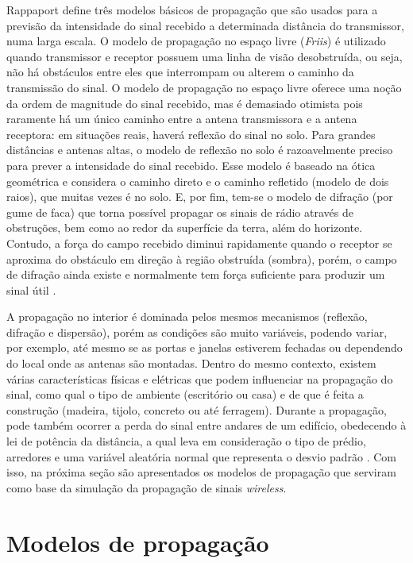 \documentclass[
	12pt,				%
	twoside,			%
	a4paper,			%
	english,			%
	french,				%
	spanish,			%
	brazil				%
	]{abntex2}
\begin{document}
Rappaport define três modelos básicos de propagação que são usados para
a previsão da intensidade do sinal recebido a determinada distância do
transmissor, numa larga escala. O modelo de propagação no espaço livre
(\emph{Friis}) é utilizado quando transmissor e receptor possuem uma
linha de visão desobstruída, ou seja, não há obstáculos entre eles que
interrompam ou alterem o caminho da transmissão do sinal. O modelo de
propagação no espaço livre oferece uma noção da ordem de magnitude do
sinal recebido, mas é demasiado otimista pois raramente há um único
caminho entre a antena transmissora e a antena receptora: em situações
reais, haverá reflexão do sinal no solo. Para grandes distâncias e
antenas altas, o modelo de reflexão no solo é razoavelmente preciso para
prever a intensidade do sinal recebido. Esse modelo é baseado na ótica
geométrica e considera o caminho direto e o caminho refletido (modelo de
dois raios), que muitas vezes é no solo. E, por fim, tem-se o modelo de
difração (por gume de faca) que torna possível propagar os sinais de
rádio através de obstruções, bem como ao redor da superfície da terra,
além do horizonte. Contudo, a força do campo recebido diminui
rapidamente quando o receptor se aproxima do obstáculo em direção à
região obstruída (sombra), porém, o campo de difração ainda existe e
normalmente tem força suficiente para produzir um sinal útil
\cite[p. 72-83]{RAPPAPORT}.

A propagação no interior é dominada pelos mesmos mecanismos (reflexão,
difração e dispersão), porém as condições são muito variáveis, podendo
variar, por exemplo, até mesmo se as portas e janelas estiverem fechadas
ou dependendo do local onde as antenas são montadas. Dentro do mesmo
contexto, existem várias características físicas e elétricas que podem
influenciar na propagação do sinal, como qual o tipo de ambiente
(escritório ou casa) e de que é feita a construção (madeira, tijolo,
concreto ou até ferragem). Durante a propagação, pode também ocorrer a
perda do sinal entre andares de um edifício, obedecendo à lei de
potência da distância, a qual leva em consideração o tipo de prédio,
arredores e uma variável aleatória normal que representa o desvio padrão
\cite[p. 104-108]{RAPPAPORT}. Com isso, na próxima seção são
apresentados os modelos de propagação que serviram como base da
simulação da propagação de sinais \emph{wireless}.

\section{Modelos de propagação}\label{modelos-de-propagauxe7uxe3o}
\end{document}
